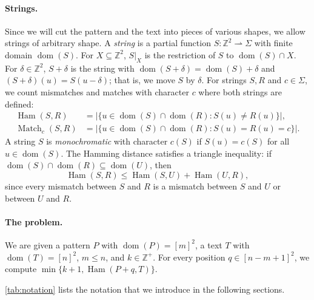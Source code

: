 \documentclass[11pt]{article}
\theoremstyle{definition}
\newcommand{\Z}{\mathbb{Z}}
\DeclareMathOperator{\Ham}{Ham}
\DeclareMathOperator{\Match}{Match}
\DeclareMathOperator{\dom}{dom}
\newcommand{\abs}[1]{\lvert #1 \rvert}
\begin{document}
\paragraph{Strings.}
Since we will cut the pattern and the text into pieces of various shapes, we allow strings of arbitrary shape.
A \emph{string} is a partial function $S \colon \Z^2 \rightharpoonup \Sigma$ with finite domain $\dom(S)$.
For $X \subseteq \Z^2$, $S|_X$ is the restriction of $S$ to $\dom(S) \cap X$.
For $\delta \in \Z^2$, $S + \delta$ is the string with $\dom(S+\delta) = \dom(S) + \delta$ and $(S+\delta)(u) = S(u - \delta)$; that is, we move $S$ by $\delta$.
For strings $S, R$ and $c \in \Sigma$, we count mismatches and matches with character $c$ where both strings are defined:
\begin{align*}
\Ham(S,R) &= \abs{\{u \in \dom(S) \cap \dom(R) : S(u) \neq R(u)\}},\\
\Match_c(S,R) &= \abs{\{u \in \dom(S) \cap \dom(R) : S(u) = R(u) = c\}}.
\end{align*}
A string $S$ is \emph{monochromatic} with character $c(S)$ if $S(u) = c(S)$ for all $u \in \dom(S)$.
The Hamming distance satisfies a triangle inequality: if $\dom(S) \cap \dom(R) \subseteq \dom(U)$, then
\begin{equation}\label{eq:triangle}
\Ham(S, R) \le \Ham(S, U) + \Ham(U, R),
\end{equation}
since every mismatch between $S$ and $R$ is a mismatch between $S$ and $U$ or between $U$ and $R$.

\paragraph{The problem.}
We are given a pattern $P$ with $\dom(P) = [m]^2$, a text $T$ with $\dom(T) = [n]^2$, $m \le n$, and $k \in \Z^+$.
For every position $q \in [n-m+1]^2$, we compute $\min\{k+1, \Ham(P+q, T)\}$.

\autoref{tab:notation} lists the notation that we introduce in the following sections.
\end{document}

